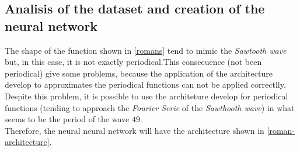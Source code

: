 \documentclass[a4paper, 11pt]{article}
\begin{document}
\subsection{Analisis of the dataset and creation of the neural network} 
The shape of the function shown in \ref{romans} tend to mimic the \textit{Sawtooth wave} but, in this case, it is not exactly periodical.This consecuence (not been periodical) give some problems, because the application of the architecture develop to approximates the periodical functions can not be applied correctlly.\\
Despite this problem, it is possible to use the architeture develop for periodical functions (tending to approach the \textit{Fourier Serie} of the \textit{Sawthooth wave}) in what seems to be the period of the wave $49$. \\
Therefore, the neural neural network will have the architecture shown in \ref{roman-architecture}.
\end{document}
